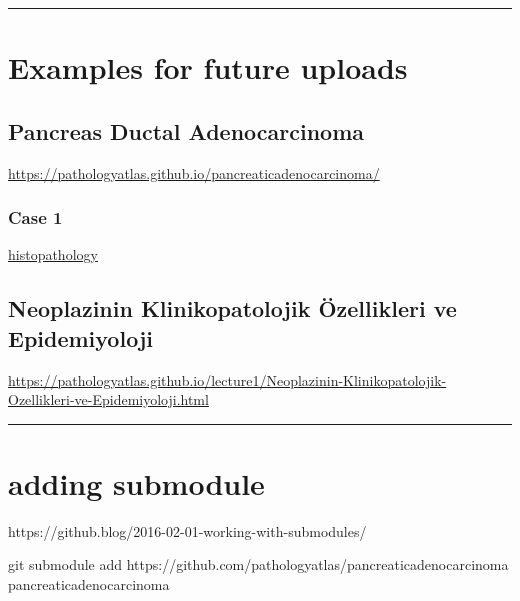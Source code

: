 \documentclass[
  letterpaper,
  DIV=11,
  numbers=noendperiod]{scrreprt}
\newenvironment{Shaded}{}{}
\newcommand{\FunctionTok}[1]{\textcolor[rgb]{0.02,0.16,0.49}{#1}}
\newcommand{\NormalTok}[1]{#1}
\begin{document}
\begin{center}\rule{0.5\linewidth}{0.5pt}\end{center}

\hypertarget{examples-for-future-uploads}{%
\chapter{Examples for future
uploads}\label{examples-for-future-uploads}}

\hypertarget{pancreas-ductal-adenocarcinoma}{%
\section{Pancreas Ductal
Adenocarcinoma}\label{pancreas-ductal-adenocarcinoma}}

\url{https://pathologyatlas.github.io/pancreaticadenocarcinoma/}

\hypertarget{case-1}{%
\subsection{Case 1}\label{case-1}}

\href{https://pathologyatlas.github.io/pancreaticadenocarcinoma/case1-histopathology/viewer_z0.html}{histopathology}

\hypertarget{neoplazinin-klinikopatolojik-uxf6zellikleri-ve-epidemiyoloji}{%
\section{Neoplazinin Klinikopatolojik Özellikleri ve
Epidemiyoloji}\label{neoplazinin-klinikopatolojik-uxf6zellikleri-ve-epidemiyoloji}}

\url{https://pathologyatlas.github.io/lecture1/Neoplazinin-Klinikopatolojik-Ozellikleri-ve-Epidemiyoloji.html}

\begin{center}\rule{0.5\linewidth}{0.5pt}\end{center}

\hypertarget{adding-submodule}{%
\chapter{adding submodule}\label{adding-submodule}}

https://github.blog/2016-02-01-working-with-submodules/

\begin{Shaded}
\begin{Highlighting}[]
\FunctionTok{git}\NormalTok{ submodule add https://github.com/pathologyatlas/pancreaticadenocarcinoma pancreaticadenocarcinoma}
\end{Highlighting}
\end{Shaded}
\end{document}
